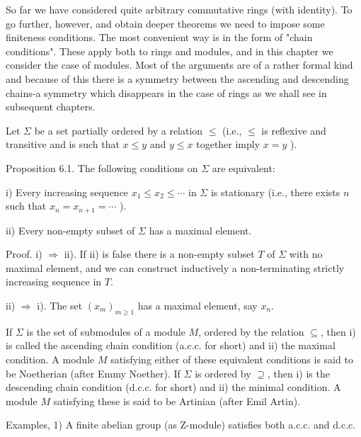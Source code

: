 \documentclass{standalone}
\theoremstyle{definition}
\theoremstyle{remark}
\begin{document}
So far we have considered quite arbitrary commutative rings (with identity). To go further, however, and obtain deeper theorems we need to impose some finiteness conditions. The most convenient way is in the form of "chain conditions". These apply both to rings and modules, and in this chapter we consider the case of modules. Most of the arguments are of a rather formal kind and because of this there is a symmetry between the ascending and descending chains-a symmetry which disappears in the case of rings as we shall see in subsequent chapters.

Let $\Sigma$ be a set partially ordered by a relation $\leqslant$ (i.e., $\leqslant$ is reflexive and transitive and is such that $x \leqslant y$ and $y \leqslant x$ together imply $x=y$ ).

Proposition 6.1. The following conditions on $\Sigma$ are equivalent:

i) Every increasing sequence $x_{1} \leqslant x_{2} \leqslant \cdots$ in $\Sigma$ is stationary (i.e., there exists $n$ such that $x_{n}=x_{n+1}=\cdots$ ).

ii) Every non-empty subset of $\Sigma$ has a maximal element.

Proof. i) $\Rightarrow$ ii). If ii) is false there is a non-empty subset $T$ of $\Sigma$ with no maximal element, and we can construct inductively a non-terminating strictly increasing sequence in $T$.

ii) $\Rightarrow$ i). The set $\left(x_{m}\right)_{m \geq 1}$ has a maximal element, say $x_{n}$.

If $\Sigma$ is the set of submodules of a module $M$, ordered by the relation $\subseteq$, then i) is called the ascending chain condition (a.c.c. for short) and ii) the maximal condition. A module $M$ satisfying either of these equivalent conditions is said to be Noetherian (after Emmy Noether). If $\Sigma$ is ordered by $\supseteq$, then i) is the descending chain condition (d.c.c. for short) and ii) the minimal condition. A module $M$ satisfying these is said to be Artinian (after Emil Artin).

Examples, 1) A finite abelian group (as Z-module) satisfies both a.c.c. and d.c.c.
\end{document}
